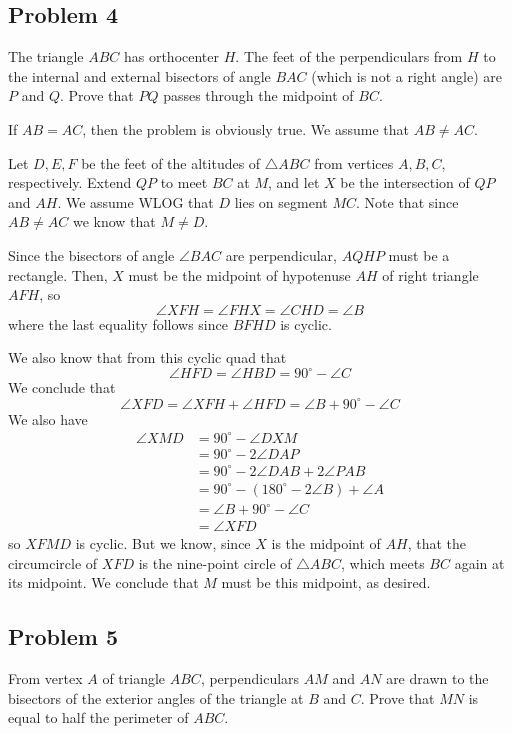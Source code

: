 \subsection{Problem 4}

The triangle $ABC$ has orthocenter $H$. The feet of the perpendiculars from $H$ to the internal and external bisectors of angle $BAC$ (which is not a right angle) are $P$ and $Q$. Prove that $PQ$ passes through the midpoint of $BC$.

\begin{mdsoln}
If $AB = AC$, then the problem is obviously true. We assume that $AB\ne AC$.

Let $D,E,F$ be the feet of the altitudes of $\triangle ABC$ from vertices $A,B,C$, respectively. Extend $QP$ to meet $BC$ at $M$, and let $X$ be the intersection of $QP$ and $AH$. We assume WLOG that $D$ lies on segment $MC$. Note that since $AB\ne AC$ we know that $M\ne D$.

Since the bisectors of angle $\angle BAC$ are perpendicular, $AQHP$ must be a rectangle. Then, $X$ must be the midpoint of hypotenuse $AH$ of right triangle $AFH$, so
\[
\angle XFH = \angle FHX = \angle CHD = \angle B
\]where the last equality follows since $BFHD$ is cyclic.

We also know that from this cyclic quad that
\[
\angle HFD = \angle HBD = 90^\circ - \angle C
\]We conclude that
\[
\angle XFD = \angle XFH + \angle HFD = \angle B + 90^\circ - \angle C
\]We also have
\begin{align*}\angle XMD & =  90^\circ - \angle DXM \\
& =  90^\circ - 2\angle DAP \\
& =  90^\circ - 2\angle DAB + 2\angle PAB \\
& =  90^\circ - (180^\circ - 2\angle B) + \angle A \\
& =  \angle B + 90^\circ - \angle C \\
& =  \angle XFD\end{align*}so $XFMD$ is cyclic. But we know, since $X$ is the midpoint of $AH$, that the circumcircle of $XFD$ is the nine-point circle of $\triangle ABC$, which meets $BC$ again at its midpoint. We conclude that $M$ must be this midpoint, as desired.

\end{mdsoln}
\subsection{Problem 5}

From vertex $A$ of triangle $ABC$, perpendiculars $AM$ and $AN$ are drawn to the bisectors of the exterior angles of the triangle at $B$ and $C$. Prove that $MN$ is equal to half the perimeter of $ABC$.

